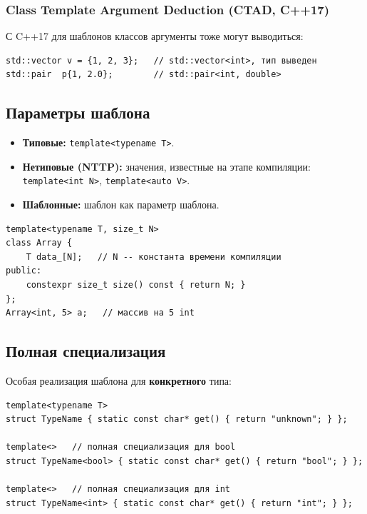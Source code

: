 \subsubsection{Class Template Argument Deduction (CTAD, C++17)}

С C++17 для шаблонов классов аргументы тоже могут выводиться:

\begin{lstlisting}
std::vector v = {1, 2, 3};   // std::vector<int>, тип выведен
std::pair  p{1, 2.0};        // std::pair<int, double>
\end{lstlisting}

\subsection{Параметры шаблона}

\begin{itemize}[leftmargin=2em]
    \item \textbf{Типовые:} \texttt{template<typename T>}.
    \item \textbf{Нетиповые (NTTP):} значения, известные на этапе компиляции:
          \texttt{template<int N>}, \texttt{template<auto V>}.
    \item \textbf{Шаблонные:} шаблон как параметр шаблона.
\end{itemize}

\begin{lstlisting}
template<typename T, size_t N>
class Array {
    T data_[N];   // N -- константа времени компиляции
public:
    constexpr size_t size() const { return N; }
};
Array<int, 5> a;   // массив на 5 int
\end{lstlisting}

\subsection{Полная специализация}

Особая реализация шаблона для \textbf{конкретного} типа:

\begin{lstlisting}
template<typename T>
struct TypeName { static const char* get() { return "unknown"; } };

template<>   // полная специализация для bool
struct TypeName<bool> { static const char* get() { return "bool"; } };

template<>   // полная специализация для int
struct TypeName<int> { static const char* get() { return "int"; } };
\end{lstlisting}

